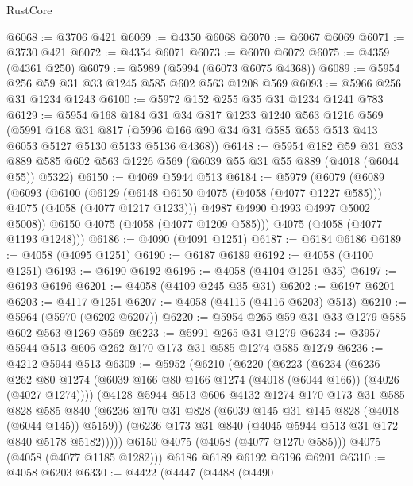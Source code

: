 \begin{lexlean}{RustCore}
\begin{coremodule}
@6068 := @3706 @421
@6069 := @4350 @6068
@6070 := @6067 @6069
@6071 := @3730 @421
@6072 := @4354 @6071
@6073 := @6070 @6072
@6075 := @4359 (@4361 @250)
@6079 := @5989 (@5994 (@6073 @6075 @4368))
@6089 := @5954 @256 @59 @31 @33 @1245 @585 @602 @563 @1208 @569
@6093 := @5966 @256 @31 @1234 @1243
@6100 := @5972 @152 @255 @35 @31 @1234 @1241 @783
@6129 := @5954
    @168
    @184
    @31
    @34
    @817
    @1233
    @1240
    @563
    @1216
    @569
    (@5991
      @168
      @31
      @817
      (@5996 @166 @90 @34 @31 @585 @653 @513 @413 @6053 @5127 @5130 @5133 @5136 @4368))
@6148 := @5954
    @182
    @59
    @31
    @33
    @889
    @585
    @602
    @563
    @1226
    @569
    (@6039 @55 @31 @55 @889 (@4018 (@6044 @55)) @5322)
@6150 := @4069 @5944 @513
@6184 := @5979
    (@6079
      (@6089
        (@6093
          (@6100
            (@6129 (@6148 @6150 @4075 (@4058 (@4077 @1227 @585))) @4075 (@4058 (@4077 @1217 @1233)))
            @4987
            @4990
            @4993
            @4997
            @5002
            @5008))
        @6150
        @4075
        (@4058 (@4077 @1209 @585)))
      @4075
      (@4058 (@4077 @1193 @1248)))
@6186 := @4090 (@4091 @1251)
@6187 := @6184 @6186
@6189 := @4058 (@4095 @1251)
@6190 := @6187 @6189
@6192 := @4058 (@4100 @1251)
@6193 := @6190 @6192
@6196 := @4058 (@4104 @1251 @35)
@6197 := @6193 @6196
@6201 := @4058 (@4109 @245 @35 @31)
@6202 := @6197 @6201
@6203 := @4117 @1251
@6207 := @4058 (@4115 (@4116 @6203) @513)
@6210 := @5964 (@5970 (@6202 @6207))
@6220 := @5954 @265 @59 @31 @33 @1279 @585 @602 @563 @1269 @569
@6223 := @5991 @265 @31 @1279
@6234 := @3957 @5944 @513 @606 @262 @170 @173 @31 @585 @1274 @585 @1279
@6236 := @4212 @5944 @513
@6309 := @5952
    (@6210
      (@6220
        (@6223
          (@6234
            (@6236
              @262
              @80
              @1274
              (@6039 @166 @80 @166 @1274 (@4018 (@6044 @166)) (@4026 (@4027 @1274))))
            (@4128
              @5944
              @513
              @606
              @4132
              @1274
              @170
              @173
              @31
              @585
              @828
              @585
              @840
              (@6236 @170 @31 @828 (@6039 @145 @31 @145 @828 (@4018 (@6044 @145)) @5159))
              (@6236 @173 @31 @840 (@4045 @5944 @513 @31 @172 @840 @5178 @5182)))))
        @6150
        @4075
        (@4058 (@4077 @1270 @585)))
      @4075
      (@4058 (@4077 @1185 @1282)))
    @6186
    @6189
    @6192
    @6196
    @6201
@6310 := @4058 @6203
@6330 := @4422
    (@4447
      (@4488
        (@4490

\end{coremodule}
\end{lexlean}
